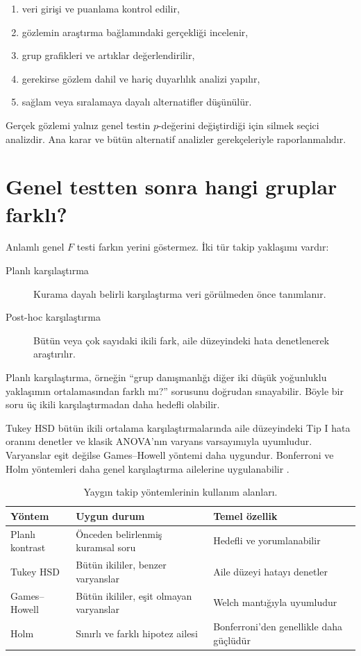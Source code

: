 \begin{enumerate}
  \item veri girişi ve puanlama kontrol edilir,
  \item gözlemin araştırma bağlamındaki gerçekliği incelenir,
  \item grup grafikleri ve artıklar değerlendirilir,
  \item gerekirse gözlem dahil ve hariç duyarlılık analizi yapılır,
  \item sağlam veya sıralamaya dayalı alternatifler düşünülür.
\end{enumerate}

Gerçek gözlemi yalnız genel testin $p$-değerini değiştirdiği için silmek
seçici analizdir. Ana karar ve bütün alternatif analizler gerekçeleriyle
raporlanmalıdır.

\section{Genel testten sonra hangi gruplar farklı?}

Anlamlı genel $F$ testi farkın yerini göstermez. İki tür takip yaklaşımı
vardır:

\begin{description}
  \item[Planlı karşılaştırma] Kurama dayalı belirli karşılaştırma veri görülmeden önce tanımlanır.
  \item[Post-hoc karşılaştırma] Bütün veya çok sayıdaki ikili fark, aile düzeyindeki hata denetlenerek araştırılır.
\end{description}

Planlı karşılaştırma, örneğin ``grup danışmanlığı diğer iki düşük yoğunluklu
yaklaşımın ortalamasından farklı mı?'' sorusunu doğrudan sınayabilir. Böyle bir
soru üç ikili karşılaştırmadan daha hedefli olabilir.

Tukey HSD bütün ikili ortalama karşılaştırmalarında aile düzeyindeki Tip I
hata oranını denetler ve klasik ANOVA'nın varyans varsayımıyla uyumludur.
Varyanslar eşit değilse Games--Howell yöntemi daha uygundur. Bonferroni ve
Holm yöntemleri daha genel karşılaştırma ailelerine uygulanabilir
\cite{tukey1953,maxwell2018}.

\begin{table}[htbp]
\centering
\caption{Yaygın takip yöntemlerinin kullanım alanları.}
\begin{tabular}{@{}p{}p{}p{}@{}}
\toprule
Yöntem & Uygun durum & Temel özellik \\
\midrule
Planlı kontrast & Önceden belirlenmiş kuramsal soru & Hedefli ve yorumlanabilir \\
Tukey HSD & Bütün ikililer, benzer varyanslar & Aile düzeyi hatayı denetler \\
Games--Howell & Bütün ikililer, eşit olmayan varyanslar & Welch mantığıyla uyumludur \\
Holm & Sınırlı ve farklı hipotez ailesi & Bonferroni'den genellikle daha güçlüdür \\
\bottomrule
\end{tabular}
\end{table}

